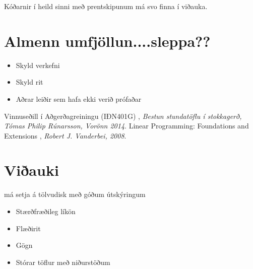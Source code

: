 \documentclass[a4paper,12pt]{article}
\begin{document}
Kóðarnir í heild sinni með prentskipunum má svo finna í viðauka.

\section{Almenn umfjöllun....sleppa??}
\begin{itemize}
\item Skyld verkefni
\item Skyld rit
\item Aðrar leiðir sem hafa ekki verið prófaðar
\end{itemize}




\pagebreak

\begin{thebibliography}{2}
	 Vinnuseðill í Aðgerðagreiningu (IÐN401G) , \textit{Bestun stundatöflu í stokkagerð, Tómas Philip Rúnarsson, Vorönn 2014}. 
	 Linear Programming: Foundations and Extensions , \textit{Robert J. Vanderbei, 2008}. 
\end{thebibliography}


\pagebreak
\section{Viðauki}

má setja á tölvudisk með góðum útskýringum
\begin{itemize}
\item Stærðfræðileg líkön
\item Flæðirit
\item Gögn
\item Stórar töflur með niðurstöðum
\end{itemize}
\end{document}
